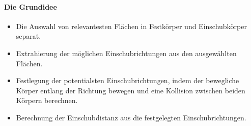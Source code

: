 \documentclass[14pt,a4paper,titlepage]{article}
\begin{document}
			\paragraph{Die Grundidee}
			\begin{itemize}
				\item Die Auswahl von relevantesten Flächen in Festkörper und Einschubkörper separat.
				\item Extrahierung der möglichen Einschubrichtungen aus den ausgewählten Flächen.
				\item Festlegung der potentialsten Einschubrichtungen, indem der bewegliche Körper entlang der Richtung bewegen und eine Kollision zwischen beiden Körpern berechnen.
				\item Berechnung der Einschubdistanz aus die festgelegten Einschubrichtungen.
			\end{itemize}
\end{document}
